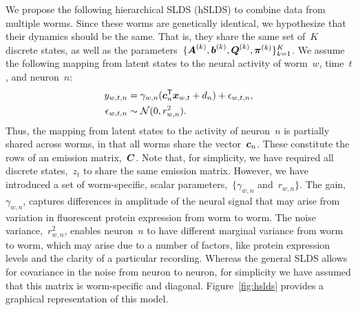 \documentclass{article}
\begin{document}
We propose the following hierarchical SLDS (hSLDS) to combine data from
multiple worms. Since these worms are genetically identical, we hypothesize
that their dynamics should be the same. That is, they share the same set
of~$K$ discrete states, as well as the
parameters~$\{\boldsymbol{A}^{(k)}, \boldsymbol{b}^{(k)}, \boldsymbol{Q}^{(k)}, \boldsymbol{\pi}^{(k)}\}_{k=1}^K$.
We assume the following mapping from latent states to the neural activity
of worm~$w$, time~$t$, and neuron~$n$:
\begin{align}
  y_{w,t,n} &= \gamma_{w,n} (\boldsymbol{c}_n^{\mathsf{T}} \boldsymbol{x}_{w,t} + d_{n}) + \epsilon_{w,t,n}, \\
  \epsilon_{w,t,n} &\sim \mathcal{N}(0, r_{w,n}^2).
\end{align}
Thus, the mapping from latent states to the activity of neuron~$n$ is
partially shared across worms, in that all worms share the
vector~$\boldsymbol{c}_n$.  These constitute the rows of an emission
matrix,~$\boldsymbol{C}$. Note that, for simplicity, we have required all
discrete states,~$z_t$ to share the same emission matrix. However, we
have introduced a set of worm-specific, scalar
parameters,~$\{\gamma_{w,n}$ and~$r_{w,n}\}$. The
gain,~$\gamma_{w,n}$, captures differences in amplitude of the neural
signal that may arise from variation in fluorescent protein expression
from worm to worm.  The noise variance,~$r_{w,n}^2$, enables
neuron~$n$ to have different marginal variance from worm to worm,
which may arise due to a number of factors, like protein expression
levels and the clarity of a particular recording.  Whereas the general
SLDS allows for covariance in the noise from neuron to neuron, for
simplicity we have assumed that this matrix is worm-specific and
diagonal. Figure~\ref{fig:hslds} provides a graphical representation
of this model.

\end{document}
